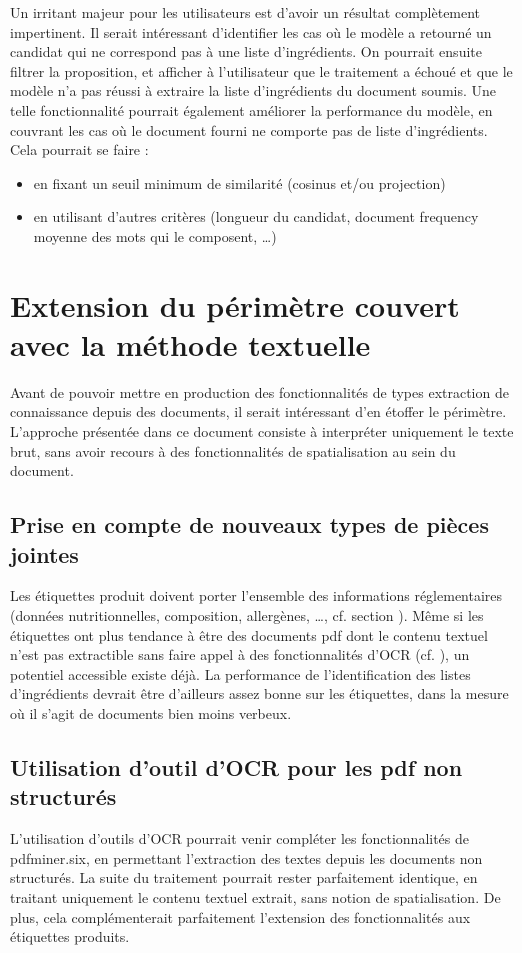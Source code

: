     Un irritant majeur pour les utilisateurs est d'avoir un résultat complètement impertinent.
    Il serait intéressant d'identifier les cas où le modèle a retourné un candidat qui ne correspond pas à une liste d'ingrédients.
    On pourrait ensuite filtrer la proposition, et afficher à l'utilisateur que le traitement a échoué et que le modèle n'a pas réussi à extraire la liste d'ingrédients du document soumis.
    Une telle fonctionnalité pourrait également améliorer la performance du modèle, en couvrant les cas où le document fourni ne comporte pas de liste d'ingrédients.
    Cela pourrait se faire :
    \begin{itemize}
        \item en fixant un seuil minimum de similarité (cosinus et/ou projection) 
        \item en utilisant d'autres critères (longueur du candidat, document frequency moyenne des mots qui le composent, \dots)
    \end{itemize}

    \section{Extension du périmètre couvert avec la méthode \og textuelle \fg}
    Avant de pouvoir mettre en production des fonctionnalités de types extraction de connaissance depuis des documents, il serait intéressant d'en étoffer le périmètre.
    L'approche présentée dans ce document consiste à interpréter uniquement le texte brut, sans avoir recours à des fonctionnalités de spatialisation au sein du document.

    \subsection{Prise en compte de nouveaux types de pièces jointes}
    Les étiquettes produit doivent porter l'ensemble des informations réglementaires (données nutritionnelles, composition, allergènes, \dots, cf. section ).
    Même si les étiquettes ont plus tendance à être des documents pdf dont le contenu textuel n'est pas extractible sans faire appel à des fonctionnalités d'OCR (cf. ), un potentiel accessible existe déjà.
    La performance de l'identification des listes d'ingrédients devrait être d'ailleurs assez bonne sur les étiquettes, dans la mesure où il s'agit de documents bien moins verbeux.

    \subsection{Utilisation d'outil d'OCR pour les pdf non structurés}
    L'utilisation d'outils d'OCR pourrait venir compléter les fonctionnalités de pdfminer.six, en permettant l'extraction des textes depuis les documents non structurés.
    La suite du traitement pourrait rester parfaitement identique, en traitant uniquement le contenu textuel extrait, sans notion de spatialisation.
    De plus, cela complémenterait parfaitement l'extension des fonctionnalités aux étiquettes produits.

